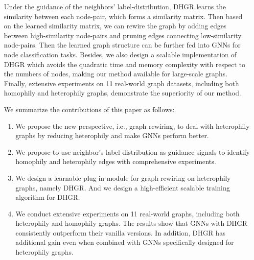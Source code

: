 \documentclass[sigconf]{acmart}
\begin{document}
	Under the guidance of the neighbors' label-distribution, DHGR learns the similarity between each node-pair, which forms a similarity matrix. Then based on the learned similarity matrix, we can rewire the graph by adding edges between high-similarity node-pairs and pruning edges connecting low-similarity node-pairs. Then the learned graph structure can be further fed into GNNs for node classification tasks. Besides, we also design a scalable implementation of DHGR which avoids the quadratic time and memory complexity with respect to the numbers of nodes, making our method available for large-scale graphs.  Finally, extensive experiments on 11 real-world graph datasets, including both homophily and heterophily graphs, demonstrate the superiority of our method.
	
We summarize the contributions of this paper as follows:
	\begin{enumerate}
		\item We propose the new perspective, i.e., graph rewiring, to deal with heterophily graphs by reducing heterophily and make GNNs perform better.
		\item We propose to use neighbor's label-distribution as guidance signals to identify homophily and heterophily edges with comprehensive experiments. 
		\item We design a learnable plug-in module for graph rewiring on heterophily graphs, namely DHGR. And we design a high-efficient scalable training algorithm for DHGR. 
		\item We conduct extensive experiments on 11 real-world graphs, including both heterophily and homophily graphs. The results show that GNNs with DHGR consistently outperform their vanilla versions.  In addition, DHGR has additional gain even when combined with GNNs specifically designed for heterophily graphs.
\end{enumerate}
\end{document}
